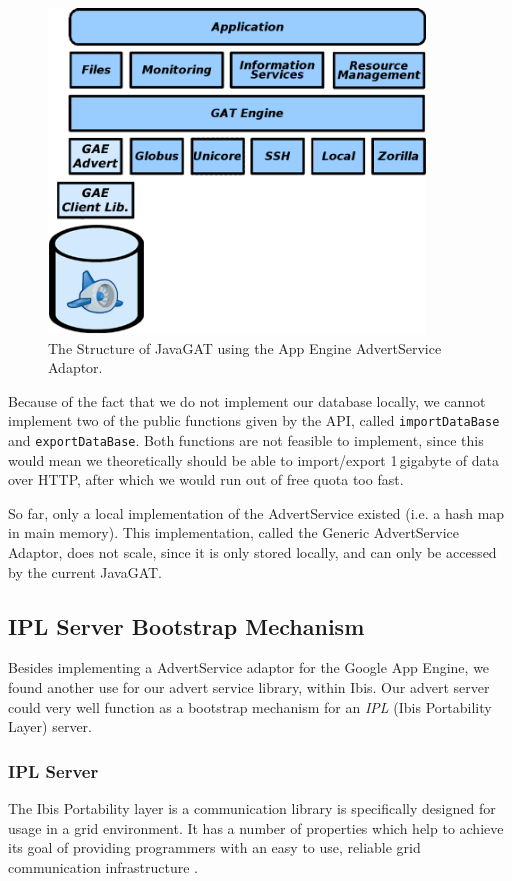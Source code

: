 \begin{figure}[ht] %
\begin{center}
\includegraphics[width=10cm]{./figures/gat-mydesign.png} 
\caption{The Structure of JavaGAT using the App
Engine AdvertService Adaptor.\label{applications-gaeasa}}
\end{center}
\end{figure}

Because of the fact that we do not implement our database locally, we cannot
implement two of the public functions given by the API, called
\texttt{importDataBase} and \texttt{exportDataBase}. Both functions are not
feasible to implement, since this would mean we theoretically should be able to
import/export 1\,gigabyte of data over HTTP, after which we would run out of
free quota too fast.

So far, only a local implementation of the AdvertService existed (i.e. a hash
map in main memory). This implementation, called the Generic AdvertService
Adaptor, does not scale, since it is only stored locally, and can only be
accessed by the current JavaGAT.

\subsection{IPL Server Bootstrap Mechanism}
\label{applications-ipl}
Besides implementing a AdvertService adaptor for the Google App Engine, we
found another use for our advert service library, within Ibis. Our advert
server could very well function as a bootstrap mechanism for an \emph{IPL} (Ibis
Portability Layer) \cite{ipl-www} server.

\subsubsection{IPL Server}
The Ibis Portability layer is a communication library is specifically
designed for usage in a grid environment. It has a number of properties which
help to achieve its goal of providing programmers with an easy to use, reliable
grid communication infrastructure \cite{ipl-www}.

